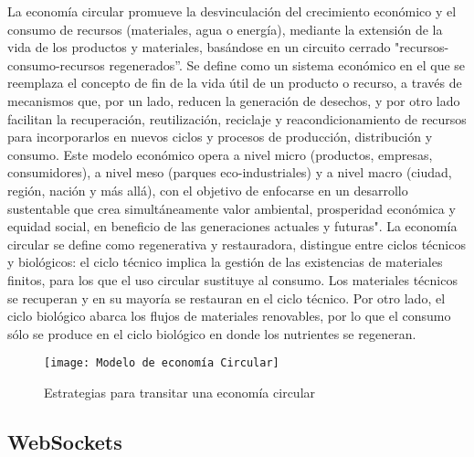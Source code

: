 \documentclass[]{article}
\begin{document}
La economía circular promueve la desvinculación del crecimiento económico y el consumo de recursos (materiales, agua o energía), mediante la extensión de la vida de los productos y materiales, basándose en un circuito cerrado "recursos-consumo-recursos regenerados”. Se define como un sistema económico en el que se reemplaza el concepto de fin de la vida útil de un producto o recurso, a través de mecanismos que, por un lado, reducen la generación de desechos, y por otro lado facilitan la recuperación, reutilización, reciclaje y reacondicionamiento de recursos para incorporarlos en nuevos ciclos y procesos de producción, distribución y consumo. Este modelo económico opera a nivel micro (productos, empresas, consumidores), a nivel meso (parques eco-industriales) y a nivel macro (ciudad, región, nación y más allá), con el objetivo de enfocarse en un desarrollo sustentable que crea simultáneamente valor ambiental, prosperidad económica y equidad social, en beneficio de las generaciones actuales y futuras"\cite{cruz2019economia}.
La economía circular se define como regenerativa y restauradora, distingue entre ciclos técnicos y biológicos: el ciclo técnico implica la gestión de las existencias de materiales finitos, para los que el uso circular sustituye al consumo. Los materiales técnicos se recuperan y en su mayoría se restauran en el ciclo técnico. Por otro lado, el ciclo biológico abarca los flujos de materiales renovables, por lo que el consumo sólo se produce en el ciclo biológico en donde los nutrientes se regeneran\cite{INECC2021EC}.

\begin{figure}[h]
	\centering
	\texttt{[image: Modelo de economía Circular]}%
	\caption{Estrategias para transitar una economía circular\cite{PROFECO2019EC}}%
	\label{b:modelo circular}%
\end{figure}

\subsection{WebSockets}
\end{document}
